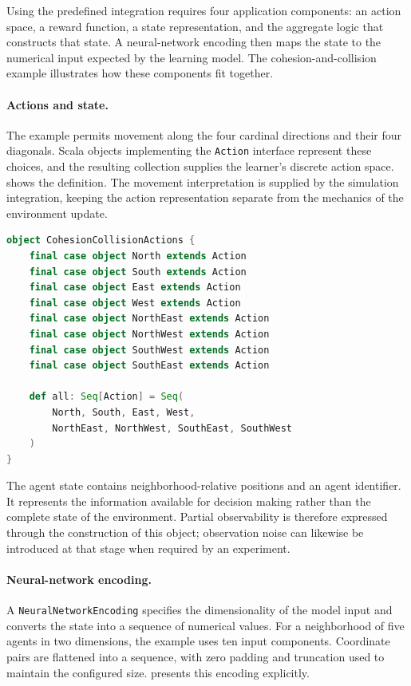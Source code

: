 Using the predefined integration requires four application components:
 an action space, a reward function, a state representation, and the
 aggregate logic that constructs that state.
%
A neural-network encoding then maps the state to the numerical input
 expected by the learning model.
%
The cohesion-and-collision example illustrates how these components
 fit together.

\paragraph{Actions and state.}
The example permits movement along the four cardinal directions and
 their four diagonals.
%
Scala objects implementing the \texttt{Action} interface represent these
 choices, and the resulting collection supplies the learner's discrete
 action space.
%
 shows the definition.
%
The movement interpretation is supplied by the simulation integration,
 keeping the action representation separate from the mechanics of the
 environment update.

\begin{lstlisting}[language=scala,breaklines=true,float=tbp,
  caption={Discrete movement actions for the cohesion-and-collision task.},
  label={lst:scarlib-actions}]
object CohesionCollisionActions {
    final case object North extends Action
    final case object South extends Action
    final case object East extends Action
    final case object West extends Action
    final case object NorthEast extends Action
    final case object NorthWest extends Action
    final case object SouthWest extends Action
    final case object SouthEast extends Action

    def all: Seq[Action] = Seq(
        North, South, East, West,
        NorthEast, NorthWest, SouthEast, SouthWest
    )
}
\end{lstlisting}

The agent state contains neighborhood-relative positions and an agent
 identifier.
%
It represents the information available for decision making rather than
 the complete state of the environment.
%
Partial observability is therefore expressed through the construction of
 this object; observation noise can likewise be introduced at that stage
 when required by an experiment.

\paragraph{Neural-network encoding.}
A \texttt{NeuralNetworkEncoding} specifies the dimensionality of the model
 input and converts the state into a sequence of numerical values.
%
For a neighborhood of five agents in two dimensions, the example uses
 ten input components.
%
Coordinate pairs are flattened into a sequence, with zero padding and
 truncation used to maintain the configured size.
%
 presents this encoding explicitly.

